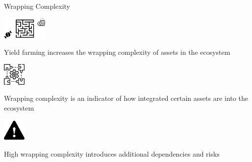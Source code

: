 \documentclass[handout]{beamer}
\begin{document}
\begin{frame}{Wrapping Complexity}
		\begin{minipage}{0.2\textwidth}
			\begin{center}
				\includegraphics[height=3em]{../assets/images/wrapping_complexity.png}
			\end{center}
		\end{minipage}
		\hspace{1 em}
		\begin{minipage}{0.72\textwidth}
		Yield farming increases the wrapping complexity of assets in the ecosystem
		\end{minipage}
		\pause
		\vspace{2 em}
		

		\begin{minipage}{0.2\textwidth}
			\begin{center}
				\includegraphics[height=3em]{../assets/images/solution.png}
			\end{center}
		\end{minipage}
		\hspace{1 em}
		\begin{minipage}{0.72\textwidth}
		Wrapping complexity is an indicator of how integrated certain assets are into the ecosystem
		\end{minipage}
		\pause
		\vspace{2 em}		
		
		
		\begin{minipage}{0.2\textwidth}
			\begin{center}
				\includegraphics[height=3em]{../assets/images/warning.png}
			\end{center}
		\end{minipage}
		\hspace{1 em}
		\begin{minipage}{0.72\textwidth}
		High wrapping complexity introduces additional dependencies and risks
		\end{minipage}
		\pause
\end{frame}
\end{document}
